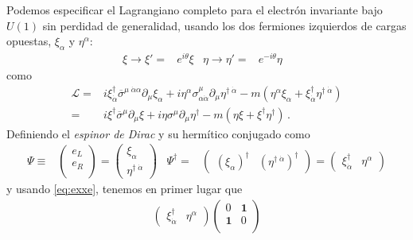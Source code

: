 \begin{frame}
Podemos especificar el Lagrangiano completo para el electrón invariante bajo $U(1)$ sin perdidad de generalidad, usando los dos fermiones izquierdos de cargas opuestas, $\xi_{\alpha}$ y $\eta^{\alpha}$:
\begin{align}
  \xi\to\xi'=&e^{i\theta}\xi &   \eta\to\eta'=&e^{-i\theta}\eta &
\end{align}
como
\begin{align}
\label{eq:dwlag}
  \mathcal{L}=&i\xi^{\dagger}_{\dot{\alpha}}\overline{\sigma}^{\mu\;\dot{\alpha}\alpha}\partial_{\mu}\xi_{\alpha}+i\eta^{\alpha}\sigma^{\mu}_{\alpha\dot{\alpha}}\partial_{\mu}\eta^{\dagger\;\dot{\alpha}}
-m \left(\eta^{\alpha} \xi_{\alpha}+\xi^{\dagger}_{\dot{\alpha}} \eta^{\dagger\;\dot{\alpha}}\right)\nonumber\\
=&i\xi^{\dagger}\overline{\sigma}^{\mu}\partial_{\mu}\xi+i\eta\sigma^{\mu}\partial_{\mu}\eta^{\dagger}
-m \left(\eta\xi+\xi^{\dagger}\eta^{\dagger} \right)\,.
\end{align}
Definiendo el \emph{espinor de Dirac}  y su hermítico conjugado como
\begin{align}
\label{eq:psid}
  \Psi\equiv&  \begin{pmatrix}
   e_L\\
   e_R\\    
  \end{pmatrix}=
  \begin{pmatrix}
   \xi_{\alpha}\\
   \eta^{\dagger\;\dot{\alpha}}    
  \end{pmatrix}&  \Psi^{\dagger}=&
  \begin{pmatrix}
   \left( \xi_{\alpha} \right)^{\dagger} & \left( \eta^{\dagger\;\dot{\alpha}} \right)^{\dagger}    
  \end{pmatrix}=  \begin{pmatrix}
  \xi^{\dagger}_{\dot{\alpha}}& \eta^{\alpha}
  \end{pmatrix}
\end{align}
y usando \eqref{eq:exxe}, tenemos en primer lugar que
\begin{align}
\label{eq:psidm}
  \begin{pmatrix}
  \xi^{\dagger}_{\dot{\alpha}}& \eta^{\alpha}
  \end{pmatrix}
  \begin{pmatrix}
    0           &\boldsymbol{1}\\
    \boldsymbol{1} &0\\

\end{pmatrix}
\end{align}
\end{frame}
